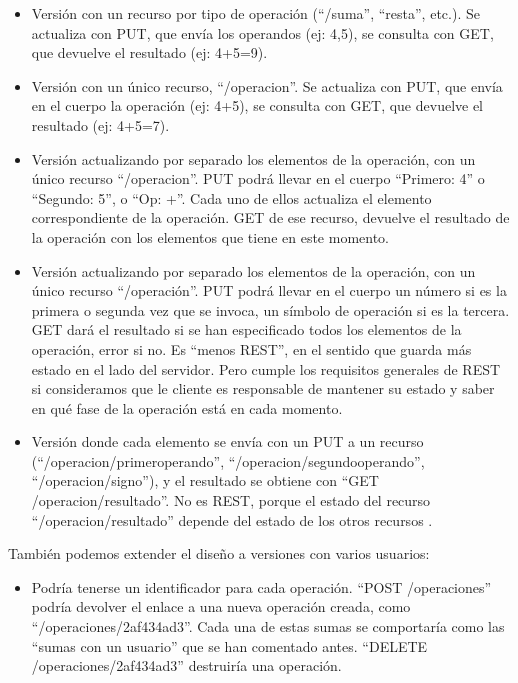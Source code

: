 \begin{itemize}
\item Versión con un recurso por tipo de operación (``/suma'', ``resta'', etc.). Se actualiza con PUT, que envía los operandos (ej: 4,5), se consulta con GET, que devuelve el resultado (ej: 4+5=9).
\item Versión con un único recurso, ``/operacion''. Se actualiza con PUT, que envía en el cuerpo la operación (ej: 4+5), se consulta con GET, que devuelve el resultado (ej: 4+5=7).
\item Versión actualizando por separado los elementos de la operación, con un único recurso ``/operacion''. PUT podrá llevar en el cuerpo ``Primero: 4'' o ``Segundo: 5'', o ``Op: +''. Cada uno de ellos actualiza el elemento correspondiente de la operación. GET de ese recurso, devuelve el resultado de la operación con los elementos que tiene en este momento.
\item Versión actualizando por separado los elementos de la operación, con un único recurso ``/operación''. PUT podrá llevar en el cuerpo un número si es la primera o segunda vez que se invoca, un símbolo de operación si es la tercera. GET dará el resultado si se han especificado todos los elementos de la operación, error si no. Es ``menos REST'', en el sentido que guarda más estado en el lado del servidor. Pero cumple los requisitos generales de REST si consideramos que le cliente es responsable de mantener su estado y saber en qué fase de la operación está en cada momento.
\item Versión donde cada elemento se envía con un PUT a un recurso (``/operacion/primeroperando'', ``/operacion/segundooperando'', ``/operacion/signo''), y el resultado se obtiene con ``GET /operacion/resultado''. No es REST, porque el estado del recurso ``/operacion/resultado'' depende del estado de los otros recursos
.
\end{itemize}

También podemos extender el diseño a versiones con varios usuarios:

\begin{itemize}
\item Podría tenerse un identificador para cada operación. ``POST /operaciones'' podría devolver el enlace a una nueva operación creada, como ``/operaciones/2af434ad3''. Cada una de estas sumas se comportaría como las ``sumas con un usuario'' que se han comentado antes. ``DELETE  /operaciones/2af434ad3'' destruiría una operación.
\end{itemize}

